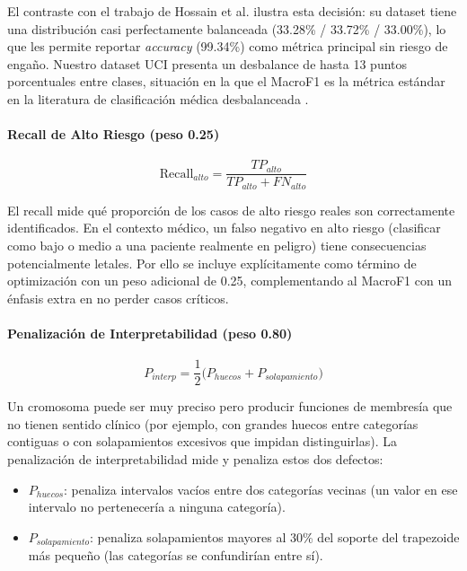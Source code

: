 \documentclass[11pt]{article}
\begin{document}
El contraste con el trabajo de Hossain et al. \cite{hossain2026} ilustra esta decisi\'on: su dataset tiene una distribuci\'on casi perfectamente balanceada (33.28\% / 33.72\% / 33.00\%), lo que les permite reportar \textit{accuracy} (99.34\%) como m\'etrica principal sin riesgo de enga\~no. Nuestro dataset UCI presenta un desbalance de hasta 13 puntos porcentuales entre clases, situaci\'on en la que el MacroF1 es la m\'etrica est\'andar en la literatura de clasificaci\'on m\'edica desbalanceada \cite{apriceno2025}.

\paragraph{Recall de Alto Riesgo (peso 0.25)}

\begin{equation}
    \text{Recall}_{alto} = \frac{TP_{alto}}{TP_{alto} + FN_{alto}}
\end{equation}

El recall mide qu\'e proporci\'on de los casos de alto riesgo reales son correctamente identificados. En el contexto m\'edico, un falso negativo en alto riesgo (clasificar como bajo o medio a una paciente realmente en peligro) tiene consecuencias potencialmente letales. Por ello se incluye expl\'icitamente como t\'ermino de optimizaci\'on con un peso adicional de 0.25, complementando al MacroF1 con un \'enfasis extra en no perder casos cr\'iticos.

\paragraph{Penalización de Interpretabilidad (peso 0.80)}

\begin{equation}
    P_{interp} = \frac{1}{2}\bigl(P_{huecos} + P_{solapamiento}\bigr)
\end{equation}

Un cromosoma puede ser muy preciso pero producir funciones de membres\'ia que no tienen sentido cl\'inico (por ejemplo, con grandes huecos entre categor\'ias contiguas o con solapamientos excesivos que impidan distinguirlas). La penalizaci\'on de interpretabilidad mide y penaliza estos dos defectos:

\begin{itemize}
    \item $P_{huecos}$: penaliza intervalos vac\'ios entre dos categor\'ias vecinas (un valor en ese intervalo no pertenecer\'ia a ninguna categor\'ia).
    \item $P_{solapamiento}$: penaliza solapamientos mayores al 30\% del soporte del trapezoide m\'as peque\~no (las categor\'ias se confundir\'ian entre s\'i).
\end{itemize}
\end{document}
